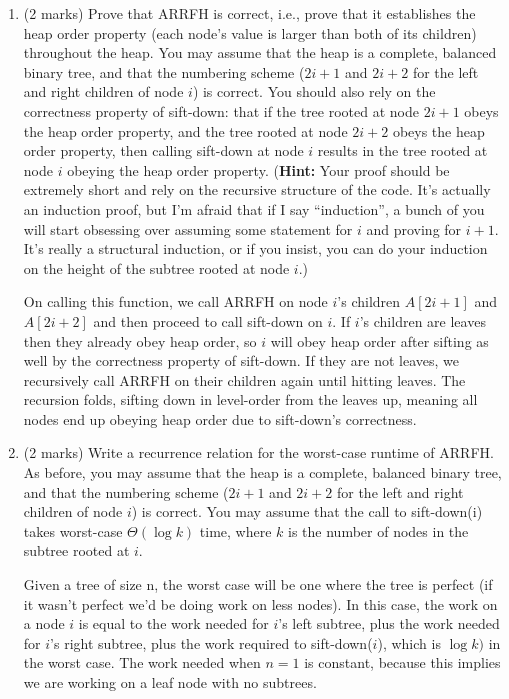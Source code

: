 \documentclass[11pt]{article}
\begin{document}
\begin{enumerate}
\item (2 marks)
Prove that ARRFH is correct, i.e., prove that it establishes the
heap order property (each node's value is larger than both of its children)
throughout the heap.
You may assume that the heap is a complete, balanced binary tree, and
that the numbering scheme ($2i+1$ and $2i+2$ for the left and right
children of node $i$) is correct.
You should also rely on the correctness property of sift-down:
that if the tree rooted at node $2i+1$ obeys the heap order property,
and the tree rooted at node $2i+2$ obeys the heap order property,
then calling sift-down at node $i$ results in the tree rooted at
node $i$ obeying the heap order property.
(\textbf{Hint:}  Your proof should be extremely short and rely
on the recursive structure of the code.  It's actually an induction proof,
but I'm afraid that if I say ``induction'', a bunch of you will start
obsessing over assuming some statement for $i$ and proving for $i+1$.
It's really a structural induction, or if you insist, you can do your
induction on the height of the subtree rooted at node $i$.)

\begin{soln}
On calling this function, we call ARRFH on node $i$'s children $A[2i+1]$ and $A[2i+2]$ and then proceed to call sift-down on $i$. If $i$'s children are leaves then they already obey heap order, so $i$ will obey heap order after sifting as well by the correctness property of sift-down. If they are not leaves, we recursively call ARRFH on their children again until hitting leaves. The recursion folds, sifting down in level-order from the leaves up, meaning all nodes end up obeying heap order due to sift-down's correctness. \\
\end{soln}

\item (2 marks)
Write a recurrence relation for the worst-case runtime of ARRFH.
As before, you may assume that the heap is a complete, balanced binary tree, and
that the numbering scheme ($2i+1$ and $2i+2$ for the left and right
children of node $i$) is correct.
You may assume that the call to sift-down(i) takes worst-case
$\Theta(\log k)$ time, where $k$ is the number of nodes in the subtree
rooted at $i$.

\begin{soln}
Given a tree of size n, the worst case will be one where the tree is perfect (if it wasn't perfect we'd be doing work on less nodes). In this case, the work on a node $i$ is equal to the work needed for $i$'s left subtree, plus the work needed for $i$'s right subtree, plus the work required to sift-down($i$), which is $\log k)$ in the worst case. The work needed when $n=1$ is constant, because this implies we are working on a leaf node with no subtrees.


\end{soln}
\end{enumerate}
\end{document}
